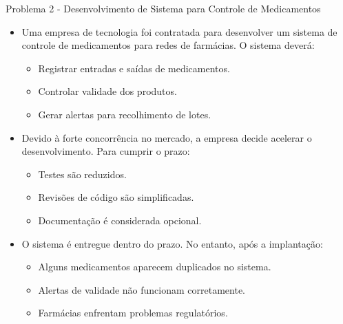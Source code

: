 \documentclass{beamer}
\begin{document}
\begin{frame}{Problema 2 - Desenvolvimento de Sistema para Controle de Medicamentos}
	\begin{itemize}
		\justifying
		\item Uma empresa de tecnologia foi contratada para desenvolver um sistema de controle de medicamentos para redes de farmácias. O sistema deverá:
			\begin{itemize}
				\justifying
				\item Registrar entradas e saídas de medicamentos.
				\item Controlar validade dos produtos.
				\item Gerar alertas para recolhimento de lotes.
			\end{itemize}
		\item Devido à forte concorrência no mercado, a empresa decide acelerar o desenvolvimento. Para cumprir o prazo:
			\begin{itemize}
				\justifying
				\item Testes são reduzidos.
				\item Revisões de código são simplificadas.
				\item Documentação é considerada opcional.
			\end{itemize}
		\item O sistema é entregue dentro do prazo. No entanto, após a implantação:
			\begin{itemize}
				\justifying
				\item Alguns medicamentos aparecem duplicados no sistema.
				\item Alertas de validade não funcionam corretamente.
				\item Farmácias enfrentam problemas regulatórios.
			\end{itemize}
	\end{itemize}
\end{frame}
\end{document}
